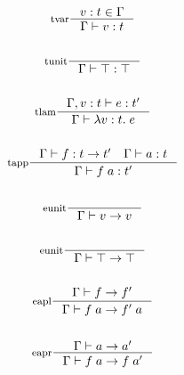 \documentclass[12pt]{article}
\begin{document}
\begin{gather*}
  \inference[tvar]{v : t \in \Gamma}{\Gamma |- v : t} \\\\
  \inference[tunit]{}{\Gamma |- \top : \top}          \\\\
  \inference[tlam]{\Gamma, v : t |- e : t'}
            {\Gamma |- \lambda v : t.\; e}            \\\\
  \inference[tapp]{\Gamma |- f : t -> t' \quad \Gamma |- a : t}
                 {\Gamma |- f\;a : t'}                \\\\
  \inference[eunit]{}{\Gamma |- v -> v}               \\\\
  \inference[eunit]{}{\Gamma |- \top -> \top}         \\\\
  \inference[eapl]{\Gamma |- f -> f'}
            {\Gamma |- f\;a -> f'\;a}                 \\\\
  \inference[eapr]{\Gamma |- a -> a'}
            {\Gamma |- f\;a -> f\;a'}                 \\\\
\end{gather*}
\end{document}
